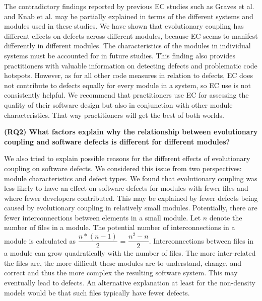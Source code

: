 \documentclass[times]{smrauth}
\begin{document}
The contradictory findings reported by previous EC studies such as Graves et al. \cite{graves2000predicting} and Knab et al. \cite{knab2006predicting} may be partially explained in terms of the different systems and modules used in these studies. We have shown that evolutionary coupling has different effects on defects across different modules, because EC seems to manifest differently in different modules. The characteristics of the modules in individual systems must be accounted for in future studies. This finding also provides practitioners with valuable information on detecting defects and problematic code hotspots. However, as for all other code measures in relation to defects, EC does not contribute to defects equally for every module in a system, so EC use is not consistently helpful. We recommend that practitioners use EC for assessing the quality of their software design but also in conjunction with other module characteristics. That way practitioners will get the best of both worlds.



\textbf{(RQ2) What factors explain why the relationship between evolutionary coupling and software defects is different for different modules?}

We also tried to explain possible reasons for the different effects of evolutionary coupling on software defects. We considered this issue from two perspectives: module characteristics and defect types. We found that evolutionary coupling was less likely to have an effect on software defects for modules with fewer files and where fewer developers contributed. This may be explained by fewer defects being caused by evolutionary coupling in relatively small modules. Potentially, there are fewer interconnections between elements in a small module. Let $n$ denote the number of files in a module. The potential number of interconnections in a module is calculated as $ \dfrac{n*(n-1)} {2}$ = $ \dfrac{n^2-n} {2}$. Interconnections between files in a module can grow quadratically with the number of files. The more inter-related the files are, the more difficult these modules are to understand, change, and correct and thus the more complex the resulting software system. This may eventually lead to defects. An alternative explanation at least for the non-density models would be that such files typically have fewer defects. %
\end{document}

